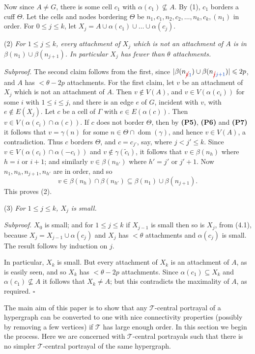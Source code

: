 Now since $A \ne G$, there is some cell $c_1$ with $\alpha(c_1) \not\subseteq A$. By (1), $c_1$ borders a cuff $\Theta$. Let the cells and nodes bordering $\Theta$ be $n_1, c_1, n_2, c_2, \dots, n_k, c_k, (n_1)$ in order. For $0 \le j \le k$, let $X_j = A \cup \alpha(c_1) \cup \dots \cup \alpha(c_j)$.

\hspace*{12pt}(2) \textit{For $1 \le j \le k$, every attachment of $X_j$ which is not an attachment of $A$ is in $\beta(n_1) \cup \beta(n_{j+1})$. In particular $X_j$ has fewer than $\theta$ attachments.}

\textit{Subproof.} The second claim follows from the first, since $|\beta(n_{\delm{k}\fix{1}}) \cup \beta(n_{\delm{j}\fix{j+1}})| \le 2p$, and $A$ has $< \theta - 2p$ attachments. For the first claim, let $v$ be an attachment of $X_j$ which is not an attachment of $A$. Then $v \notin V(A)$, and $v \in V(\alpha(c_i))$ for some $i$ with $1 \le i \le j$, and there is an edge $e$ of $G$, incident with $v$, with $e \notin E(X_j)$. Let $c$ be a cell of $\Gamma$ with $e \in E(\alpha(c))$. Then $v \in V(\alpha(c_i) \cap \alpha(c))$. If $c$ does not border $\Theta$, then by \textbf{(P5)}, \textbf{(P6)} and \textbf{(P7)} it follows that $v = \gamma(n)$ for some $n \in \Theta \cap \operatorname{dom}(\gamma)$, and hence $v \in V(A)$, a contradiction. Thus $c$ borders $\Theta$, and $c = c_{j'}$, say, where $j < j' \le k$. Since $v \in V(\alpha(c_i) \cap \alpha(-c_i))$ and $v \notin \gamma(\tilde{c}_i)$, it follows that $v \in \beta(n_h)$ where $h = i$ or $i+1$; and similarly $v \in \beta(n_{h'})$ where $h' = j'$ or $j'+1$. Now $n_1, n_h, n_{j+1}, n_{h'}$ are in order, and so
\begin{equation*}
v \in \beta(n_h) \cap \beta(n_{h'}) \subseteq \beta(n_1) \cup \beta(n_{j+1}).
\end{equation*}
This proves (2).

\hspace*{12pt}(3) \textit{For $1 \le j \le k$, $X_j$ is small.}

\textit{Subproof.} $X_0$ is small; and for $1 \le j \le k$ if $X_{j-1}$ is small then so is $X_j$, from (4.1), because $X_j = X_{j-1} \cup \alpha(c_j)$ and $X_j$ has $< \theta$ attachments and $\alpha(c_j)$ is small. The result follows by induction on $j$.

In particular, $X_k$ is small. But every attachment of $X_k$ is an attachment of $A$, as is easily seen, and so $X_k$ has $< \theta - 2p$ attachments. Since $\alpha(c_1) \subseteq X_k$ and $\alpha(c_1) \not\subseteq A$ it follows that $X_k \ne A$; but this contradicts the maximality of $A$, as required. $\square$


The main aim of this paper is to show that any $\mathscr{T}$-central portrayal of a hypergraph can be converted to one with nice connectivity properties (possibly by removing a few vertices) if $\mathscr{T}$ has large enough order. In this section we begin the process. Here we are concerned with $\mathscr{T}$-central portrayals such that there is no simpler $\mathscr{T}$-central portrayal of the same hypergraph.
